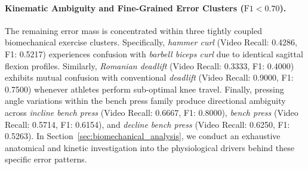 \documentclass[runningheads]{llncs}
\begin{document}
\paragraph{Kinematic Ambiguity and Fine-Grained Error Clusters ($\text{F1} < 0.70$).} The remaining error mass is concentrated within three tightly coupled biomechanical exercise clusters. Specifically, \textit{hammer curl} (Video Recall: 0.4286, F1: 0.5217) experiences confusion with \textit{barbell biceps curl} due to identical sagittal flexion profiles. Similarly, \textit{Romanian deadlift} (Video Recall: 0.3333, F1: 0.4000) exhibits mutual confusion with conventional \textit{deadlift} (Video Recall: 0.9000, F1: 0.7500) whenever athletes perform sub-optimal knee travel. Finally, pressing angle variations within the bench press family produce directional ambiguity across \textit{incline bench press} (Video Recall: 0.6667, F1: 0.8000), \textit{bench press} (Video Recall: 0.5714, F1: 0.6154), and \textit{decline bench press} (Video Recall: 0.6250, F1: 0.5263). In Section~\ref{sec:biomechanical_analysis}, we conduct an exhaustive anatomical and kinetic investigation into the physiological drivers behind these specific error patterns.
\end{document}
